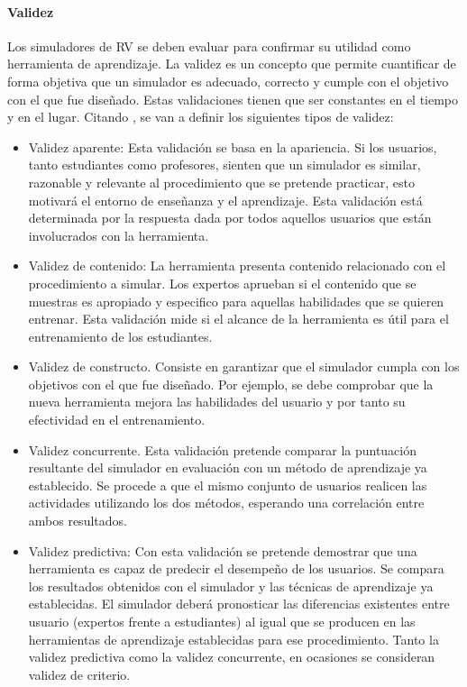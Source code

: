\paragraph{Validez}

Los simuladores de \ac{RV} se deben evaluar para confirmar su utilidad como herramienta de aprendizaje. La validez es un concepto que permite cuantificar de forma objetiva que un simulador es adecuado, correcto y cumple con el objetivo con el que fue diseñado.
Estas validaciones tienen que ser constantes en el tiempo y en el lugar. Citando \cite{pales2010uso}, se van a definir los siguientes tipos de validez:
\begin{itemize}
    \item Validez aparente:
    Esta validación se basa en la apariencia. Si los usuarios, tanto estudiantes como profesores, sienten que un simulador es similar, razonable y relevante al procedimiento que se pretende practicar, esto motivará el entorno de enseñanza y el aprendizaje. Esta validación está determinada por la respuesta dada por todos aquellos usuarios que están involucrados con la herramienta.
    
    \item Validez de contenido: La herramienta presenta contenido relacionado con el procedimiento a simular. Los expertos aprueban si el contenido que se muestras es apropiado y especifico para aquellas habilidades que se quieren entrenar.
    Esta validación mide si el alcance de la herramienta es útil para el entrenamiento de los estudiantes.
    
        \item Validez de constructo.
    Consiste en garantizar que el simulador cumpla con los objetivos con el que fue diseñado. Por ejemplo, se debe comprobar que la nueva herramienta mejora las habilidades del usuario y por tanto su efectividad en el entrenamiento. 
    
    \item Validez concurrente.
    Esta validación pretende comparar la puntuación resultante del simulador en evaluación con un método de aprendizaje ya establecido. Se procede a que el mismo conjunto de usuarios realicen las actividades utilizando los dos métodos, esperando una correlación entre ambos resultados.

    \item Validez predictiva:
    Con esta validación se pretende demostrar que una herramienta es capaz de predecir el desempeño de los usuarios. Se compara los resultados obtenidos con el simulador y las técnicas de aprendizaje ya establecidas. El simulador deberá pronosticar las diferencias existentes entre usuario (expertos frente a estudiantes) al igual que se producen en las herramientas de aprendizaje establecidas para ese procedimiento.  Tanto la validez predictiva como la validez concurrente, en ocasiones se consideran validez de criterio. 
    

\end{itemize}
